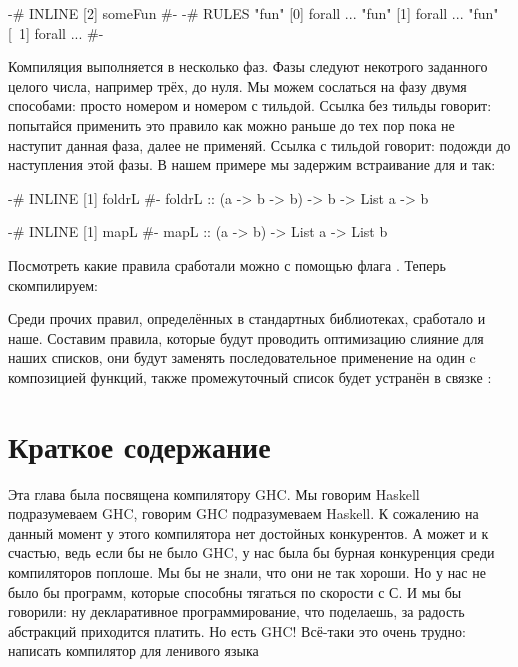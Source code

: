 \begin{code}
{-# INLINE [2] someFun #-}
{-# RULES
"fun" [0] forall ... 
"fun" [1] forall ... 
"fun" [~1] forall ... 
  #-}
\end{code}

Компиляция выполняется в несколько фаз.
Фазы следуют некотрого заданного целого числа, например трёх, до нуля.
Мы можем сослаться на фазу двумя способами: просто номером
и номером с тильдой. Ссылка без тильды говорит: попытайся применить
это правило как можно раньше до тех пор пока не наступит 
данная фаза, далее не применяй. Ссылка с тильдой говорит: 
подожди до наступления этой фазы. В нашем примере
мы задержим встраивание для  и  так:

\begin{code}
{-# INLINE [1] foldrL #-}
foldrL :: (a -> b -> b) -> b -> List a -> b

{-# INLINE [1] mapL #-}
mapL :: (a -> b) -> List a -> List b
\end{code}

Посмотреть какие правила сработали можно с помощью флага 
. Теперь скомпилируем:


Среди прочих правил, определённых в стандартных библиотеках,
сработало и наше. Составим правила, которые будут 
проводить оптимизацию слияние для наших списков, они 
будут заменять последовательное применение
 на один  c композицией функций,
также промежуточный список будет устранён в связке
:

\section{Краткое содержание}

Эта глава была посвящена компилятору GHC. Мы говорим Haskell
подразумеваем GHC, говорим GHC подразумеваем Haskell. 
К сожалению на данный момент у этого компилятора нет достойных
конкурентов. А может и к счастью, ведь если бы не было
GHC, у нас была бы бурная конкуренция среди компиляторов 
поплоше. Мы бы не знали, что они не так хороши. 
Но у нас не было бы программ, которые способны тягаться 
по скорости с С. И мы бы говорили: ну декларативное 
программирование, что поделаешь, за радость абстракций 
приходится платить. Но есть GHC! Всё-таки это очень
трудно: написать компилятор для ленивого языка

